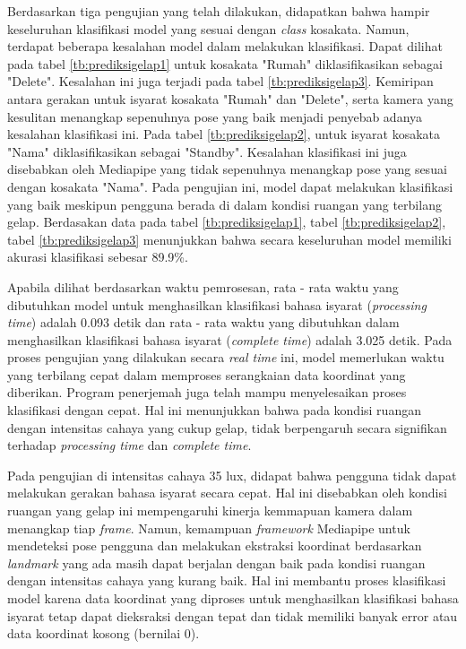Berdasarkan tiga pengujian yang telah dilakukan, didapatkan bahwa hampir keseluruhan klasifikasi model yang sesuai dengan \emph{class} kosakata. Namun, terdapat beberapa kesalahan model dalam melakukan klasifikasi. Dapat dilihat pada tabel \ref{tb:prediksigelap1} untuk kosakata "Rumah" diklasifikasikan sebagai "Delete". Kesalahan ini juga terjadi pada tabel \ref{tb:prediksigelap3}. Kemiripan antara gerakan untuk isyarat kosakata "Rumah" dan "Delete", serta kamera yang kesulitan menangkap sepenuhnya pose yang baik menjadi penyebab adanya kesalahan klasifikasi ini. Pada tabel \ref{tb:prediksigelap2}, untuk isyarat kosakata "Nama" diklasifikasikan sebagai "Standby". Kesalahan klasifikasi ini juga disebabkan oleh Mediapipe yang tidak sepenuhnya menangkap pose yang sesuai dengan kosakata "Nama". Pada pengujian ini,  model dapat melakukan klasifikasi yang baik meskipun pengguna berada di dalam kondisi ruangan yang terbilang gelap. Berdasakan data pada tabel \ref{tb:prediksigelap1}, tabel \ref{tb:prediksigelap2}, tabel \ref{tb:prediksigelap3} menunjukkan bahwa secara keseluruhan model memiliki akurasi klasifikasi sebesar 89.9\%. 

Apabila dilihat berdasarkan waktu pemrosesan, rata - rata waktu yang dibutuhkan model untuk menghasilkan klasifikasi bahasa isyarat (\emph{processing time}) adalah 0.093 detik dan rata - rata waktu yang dibutuhkan dalam menghasilkan klasifikasi bahasa isyarat (\emph{complete time}) adalah 3.025 detik. Pada proses pengujian yang dilakukan secara \emph{real time} ini, model memerlukan waktu yang terbilang cepat dalam memproses serangkaian data koordinat yang diberikan. Program penerjemah juga telah mampu menyelesaikan proses klasifikasi dengan cepat. Hal ini menunjukkan bahwa pada kondisi ruangan dengan intensitas cahaya yang cukup gelap, tidak berpengaruh secara signifikan terhadap \emph{processing time} dan \emph{complete time}.

Pada pengujian di intensitas cahaya 35 lux, didapat bahwa pengguna tidak dapat melakukan gerakan bahasa isyarat secara cepat. Hal ini disebabkan oleh kondisi ruangan yang gelap ini mempengaruhi kinerja kemmapuan kamera dalam menangkap tiap \emph{frame}. Namun, kemampuan \emph{framework} Mediapipe untuk mendeteksi pose pengguna dan melakukan ekstraksi koordinat berdasarkan \emph{landmark} yang ada masih dapat berjalan dengan baik pada kondisi ruangan dengan intensitas cahaya yang kurang baik. Hal ini membantu proses klasifikasi model karena data koordinat yang diproses untuk menghasilkan klasifikasi bahasa isyarat tetap dapat dieksraksi dengan tepat dan tidak memiliki banyak error atau data koordinat kosong (bernilai 0). 

